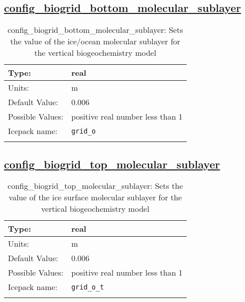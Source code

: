 \subsection[config\_biogrid\_bottom\_molecular\_sublayer]{\hyperref[sec:nm_tab_biogeochemistry]{config\_biogrid\_bottom\_molecular\_sublayer}}
\label{subsec:nm_sec_config_biogrid_bottom_molecular_sublayer}
\begin{center}
\begin{longtable}{| p{2.0in} || p{4.0in} |}
    \hline
    Type: & real \\
    \hline
    Units: & \si{m} \\
    \hline
    Default Value: & 0.006 \\
    \hline
    Possible Values: & positive real number less than 1 \\
    \hline
    Icepack name: & \verb+grid_o+ \\
    \hline
    \caption{config\_biogrid\_bottom\_molecular\_sublayer: Sets the value of the ice/ocean molecular sublayer for the vertical biogeochemistry model}
\end{longtable}
\end{center}
\subsection[config\_biogrid\_top\_molecular\_sublayer]{\hyperref[sec:nm_tab_biogeochemistry]{config\_biogrid\_top\_molecular\_sublayer}}
\label{subsec:nm_sec_config_biogrid_top_molecular_sublayer}
\begin{center}
\begin{longtable}{| p{2.0in} || p{4.0in} |}
    \hline
    Type: & real \\
    \hline
    Units: & \si{m} \\
    \hline
    Default Value: & 0.006 \\
    \hline
    Possible Values: & positive real number less than 1 \\
    \hline
    Icepack name: & \verb+grid_o_t+ \\
    \hline
    \caption{config\_biogrid\_top\_molecular\_sublayer: Sets the value of the ice surface molecular sublayer for the vertical biogeochemistry model}
\end{longtable}
\end{center}
